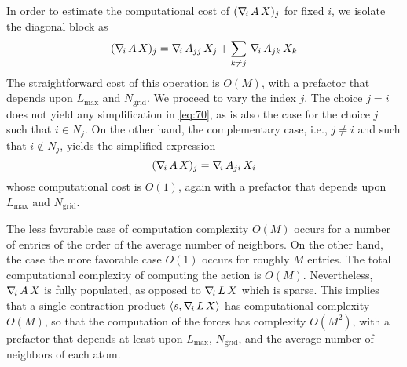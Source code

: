 In order to estimate the computational cost of $( \nabla_{\!i}\, A \, X)_j$ for fixed $i$, we isolate the diagonal block as
\begin{equation}\label{eq:70}
( \nabla_{\!i}\, A \, X)_j = \nabla_{\!i}\, A_{jj} \, X_j + \sum_{k\not=j} \,\nabla_{\!i}\, A_{jk} \, X_k
\end{equation}
The straightforward cost of this operation is $O(M)$, with a prefactor that depends upon $L_\text{max}$ and $N_\text{grid}$. We proceed to vary the index $j$. The choice $j = i$ does not yield any simplification in \eqref{eq:70}, as is also the case for the choice $j$ such that $i \in N_j$. On the other hand, the complementary case, i.e., $j \not=i$ and such that $i \not\in N_j$, yields the simplified expression
\[
( \nabla_{\!i}\, A \, X)_j = \nabla_{\!i}\, A_{ji} \, X_i
\]
whose computational cost is $O(1)$, again with a prefactor that depends upon $L_\text{max}$ and $N_\text{grid}$.

The less favorable case of computation complexity $O(M)$ occurs for a number of entries of the order of the average number of neighbors. On the other hand, the case the more favorable case $O(1)$ occurs for roughly $M$ entries. The total computational complexity of computing the action is $O(M)$. Nevertheless, $\nabla_{\!i}\, A \, X$ is fully populated, as opposed to $\nabla_{\!i}\, L \, X$ which is sparse. This implies that a single contraction product $\langle s , \nabla_{\!i}\, L \, X \rangle$ has computational complexity $O(M)$, so that the computation of the forces has complexity $O(M^2)$, with a prefactor that depends at least upon $L_\text{max}$, $N_\text{grid}$, and the average number of neighbors of each atom.

